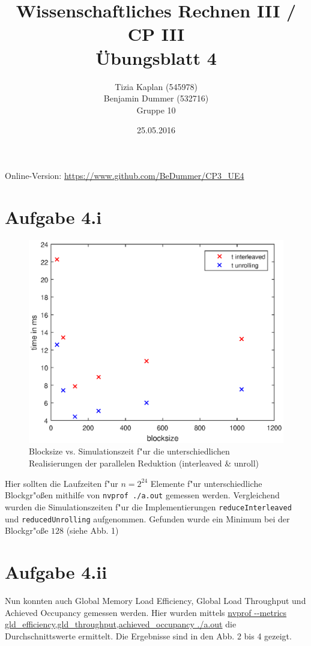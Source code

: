 \documentclass[%
	paper=A4,	%
	pagesize,	%
	DIV=calc,	%
	smallheadings,	%
	ngerman		%
]{scrartcl}
\title{{\bf Wissenschaftliches Rechnen III / CP III}\\Übungsblatt 4}
\author{Tizia Kaplan (545978)\\Benjamin Dummer (532716)\\ Gruppe 10}
\date{25.05.2016}
\begin{document}
\maketitle
Online-Version: \href{https://www.github.com/BeDummer/CP3_UE4}{\url{https://www.github.com/BeDummer/CP3_UE4}}

\section*{Aufgabe 4.i}

\begin{figure}[!b]
  \centering
  \includegraphics[width=.75\textwidth]{blocksize_vs_time_interl_unroll.eps}
  \caption{Blocksize vs. Simulationszeit f"ur die unterschiedlichen Realisierungen der parallelen Reduktion (interleaved \& unroll)}
\end{figure}

Hier sollten die Laufzeiten f"ur $n=2^{24}$ Elemente f"ur unterschiedliche Blockgr"o\ss en mithilfe von \texttt{nvprof ./a.out} gemessen werden. Vergleichend wurden die Simulationszeiten f"ur die Implementierungen \texttt{reduceInterleaved} und \texttt{reducedUnrolling} aufgenommen. Gefunden wurde ein Minimum bei der Blockgr"o\ss e $128$ (siehe Abb. 1) 

\section*{Aufgabe 4.ii}
Nun konnten auch Global Memory Load Efficiency, Global Load Throughput und Achieved Occupancy gemessen werden. Hier wurden mittels \url{nvprof --metrics gld_efficiency,gld_throughput,achieved_occupancy ./a.out} die Durchschnittswerte ermittelt. Die Ergebnisse sind in den Abb. 2 bis 4 gezeigt.
\end{document}
